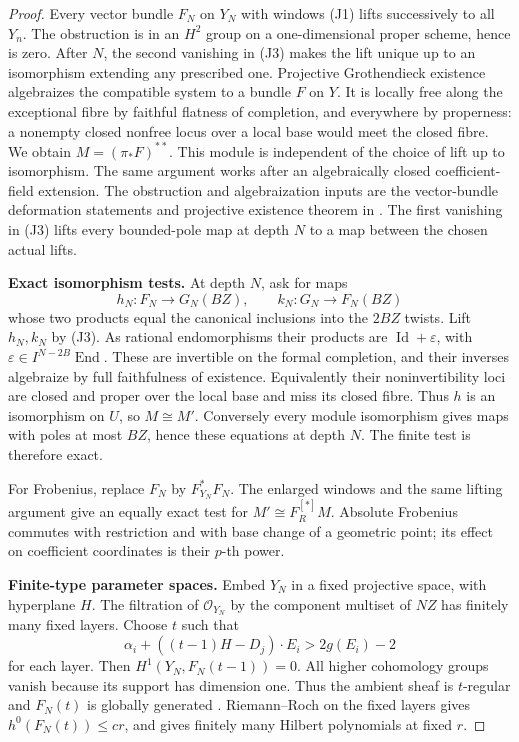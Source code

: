 \begin{proof}
Every vector bundle \(F_N\) on \(Y_N\) with windows (J1) lifts
successively to all \(Y_n\). The obstruction is in an \(H^2\)
group on a one-dimensional proper scheme, hence is zero.
After \(N\), the second vanishing in (J3) makes the lift unique
up to an isomorphism extending any prescribed one.
Projective Grothendieck existence algebraizes the compatible
system to a bundle \(F\) on \(Y\).
It is locally free along the exceptional fibre by faithful
flatness of completion, and everywhere by properness: a
nonempty closed nonfree locus over a local base would meet
the closed fibre. We obtain \(M=(\pi_*F)^{**}\).
This module is independent of the choice of lift up to
isomorphism. The same argument works after an algebraically
closed coefficient-field extension.
The obstruction and algebraization inputs are the
vector-bundle deformation statements and projective existence
theorem in
\cite[Tags 08MF, 08MD, 0885]{StacksLocalAtlasB}.
The first vanishing in (J3) lifts every bounded-pole map at depth
\(N\) to a map between the chosen actual lifts.

\par\smallskip\noindent\textbf{Exact isomorphism tests.}\quad
At depth \(N\), ask for maps
\[
 h_N:F_N\to G_N(BZ),\qquad k_N:G_N\to F_N(BZ)
\]
whose two products equal the canonical inclusions into the
\(2BZ\) twists.
Lift \(h_N,k_N\) by (J3).
As rational endomorphisms their products are
\(\operatorname{Id}+\varepsilon\), with
\(\varepsilon\in I^{N-2B}\operatorname{End}\).
These are invertible on the formal completion, and their
inverses algebraize by full faithfulness of existence.
Equivalently their noninvertibility loci are closed and proper
over the local base and miss its closed fibre.
Thus \(h\) is an isomorphism on \(U\), so \(M\cong M'\).
Conversely every module isomorphism gives maps with poles at most
\(BZ\), hence these equations at depth \(N\).
The finite test is therefore exact.

For Frobenius, replace \(F_N\) by \(F_{Y_N}^*F_N\).
The enlarged windows and the same lifting argument give an
equally exact test for \(M'\cong F_R^{[*]}M\).
Absolute Frobenius commutes with restriction and with base
change of a geometric point; its effect on coefficient
coordinates is their \(p\)-th power.

\par\smallskip\noindent\textbf{Finite-type parameter spaces.}\quad
Embed \(Y_N\) in a fixed projective space, with hyperplane \(H\).
The filtration of \(\mathcal O_{Y_N}\) by the component multiset
of \(NZ\) has finitely many fixed layers.
Choose \(t\) such that
\[
 \alpha_i+((t-1)H-D_j)\cdot E_i>2g(E_i)-2
\]
for each layer. Then \(H^1(Y_N,F_N(t-1))=0\).
All higher cohomology groups vanish because its support has
dimension one. Thus the ambient sheaf is \(t\)-regular and
\(F_N(t)\) is globally generated
\cite[Tag 08A8]{StacksLocalAtlasB}.
Riemann--Roch on the fixed layers gives
\(h^0(F_N(t))\leq c r\), and gives finitely many Hilbert
polynomials at fixed \(r\).


\end{proof}
